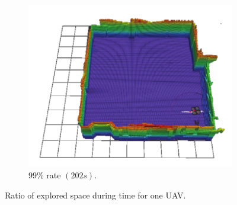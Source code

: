 \documentclass[11pt,openany]{book}
\begin{document}
\begin{figure}[H]
\begin{subfigure}[H]{0.3\linewidth}
        \label{fig:3.13i}
    \end{subfigure}
    \begin{subfigure}[H]{0.3\linewidth}
        \includegraphics[width=\linewidth]{assets/3_13_j.png}
        \caption{{$99\%$ rate $(202s).$}}
        \label{fig:3.13j}
    \end{subfigure}
    \caption{Ratio of explored space during time for one UAV.}
    \label{fig:3.13}
\end{figure}
\end{document}
